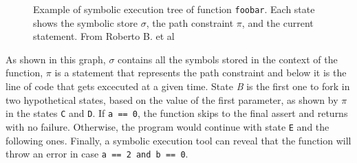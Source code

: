 \begin{figure}[H]
{%
}
\caption{Example of symbolic execution tree of function \texttt{foobar}. Each state shows the symbolic store $\sigma$, the path constraint $\pi$, and the current statement. From Roberto B. et al \cite{symbolicExecutionDef}}
\end{figure}

As shown in this graph, $\sigma$ contains all the symbols stored in the context of the function, $\pi$ is a statement that represents the path constraint and below it is the line of code that gets excecuted at a given time. State \textit{B} is the first one to fork in two hypothetical states, based on the value of the first parameter, as shown by $\pi$ in the states \texttt{C} and \texttt{D}. If \texttt{a == 0}, the function skips to the final assert and returns with no failure. Otherwise, the program would continue with state \texttt{E} and the following ones. Finally, a symbolic execution tool can reveal that the function will throw an error in case \texttt{a == 2 and b == 0}.

